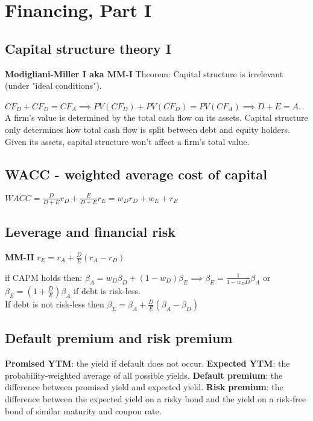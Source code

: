 \section{Financing, Part I}

\subsection*{Capital structure theory I}

{\bf Modigliani-Miller I aka MM-I} Theorem: Capital structure is irrelevant (under "ideal conditions").

$CF_D + CF_D = CF_A \implies PV(CF_D) + PV(CF_D) = PV(CF_A) \implies D+E=A $.  A firm’s value is determined by the total cash flow on its assets.
Capital structure only determines how total cash flow is split between debt
and equity holders. Given its assets, capital structure won’t affect a firm’s total value.

\subsection*{WACC - weighted average cost of capital}
$WACC=\frac{D}{D+E}r_D + \frac{E}{D+E}r_E = w_D r_D + w_E + r_E$

\subsection*{Leverage and financial risk}

{\bf MM-II}  $r_E = r_A + \frac{D}{E} (r_A-r_D)$

if CAPM holds then:  $\beta_A =w_D \beta_D + (1-w_D) \beta_E \implies \beta_E = \frac{1}{1-w_DD}\beta_A$ or \\
$\beta_E = (1+\frac{D}{E})\beta_A$ if debt is risk-less. \\
If debt is not risk-less then $\beta_E = \beta_A +\frac{D}{E}(\beta_A-\beta_D)$


\subsection*{Default premium and risk premium}

{\bf Promised YTM}: the yield if default does not occur.
{\bf Expected YTM}: the probability-weighted average of all possible yields.
{\bf Default premium}: the difference between promised yield and expected yield.
{\bf Risk premium}: the difference between the expected yield on a risky bond and the yield on a risk-free bond of similar maturity and coupon rate.

